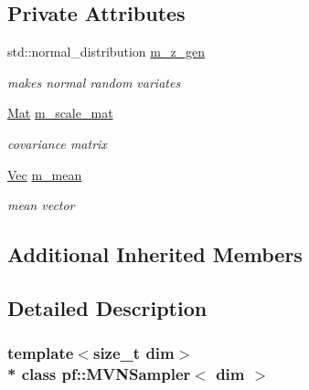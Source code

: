 \subsection*{Private Attributes}
\begin{DoxyCompactItemize}
\item 
std\+::normal\+\_\+distribution \hyperlink{classpf_1_1MVNSampler_aeceedd415d59b513914d29410488caa9}{m\+\_\+z\+\_\+gen}\hypertarget{classpf_1_1MVNSampler_aeceedd415d59b513914d29410488caa9}{}\label{classpf_1_1MVNSampler_aeceedd415d59b513914d29410488caa9}

\begin{DoxyCompactList}\small\item\em makes normal random variates \end{DoxyCompactList}\item 
\hyperlink{classpf_1_1MVNSampler_a5bd837d18f475be7d0495470b6198a46}{Mat} \hyperlink{classpf_1_1MVNSampler_a6f12200aa3bb97e0e91fd6f69597015a}{m\+\_\+scale\+\_\+mat}\hypertarget{classpf_1_1MVNSampler_a6f12200aa3bb97e0e91fd6f69597015a}{}\label{classpf_1_1MVNSampler_a6f12200aa3bb97e0e91fd6f69597015a}

\begin{DoxyCompactList}\small\item\em covariance matrix \end{DoxyCompactList}\item 
\hyperlink{classpf_1_1MVNSampler_a70fb0813dd4b02e0563512c34079fee3}{Vec} \hyperlink{classpf_1_1MVNSampler_a55453f92155dbe5499669a9c86d146c3}{m\+\_\+mean}\hypertarget{classpf_1_1MVNSampler_a55453f92155dbe5499669a9c86d146c3}{}\label{classpf_1_1MVNSampler_a55453f92155dbe5499669a9c86d146c3}

\begin{DoxyCompactList}\small\item\em mean vector \end{DoxyCompactList}\end{DoxyCompactItemize}
\subsection*{Additional Inherited Members}


\subsection{Detailed Description}
\subsubsection*{template$<$size\+\_\+t dim$>$\\*
class pf\+::\+M\+V\+N\+Sampler$<$ dim $>$}

